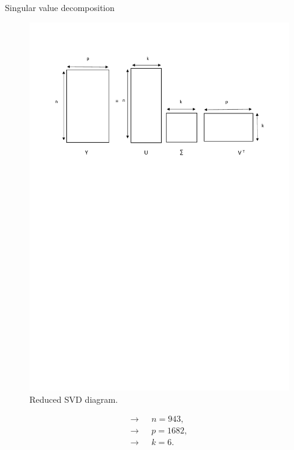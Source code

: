 \documentclass[unknownkeysallowed]{beamer}
\begin{document}
\begin{frame}{Singular value decomposition}
  \begin{figure}[H]
\centering
  \includegraphics[scale=0.4]{./images/svd.pdf}
  \caption{Reduced SVD diagram.}
  \label{fig:svd}
\end{figure}
\begin{align*}
    \longrightarrow \text{ }& n=943,\\
    \longrightarrow \text{ }& p=1682,\\
    \longrightarrow \text{ }& k=6.
\end{align*}
\end{frame}
\end{document}
